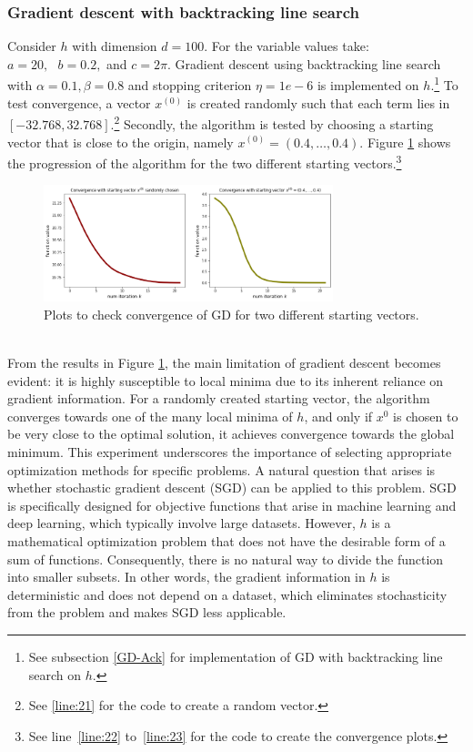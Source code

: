  \subsubsection{Gradient descent with backtracking line search}
 Consider $h$ with dimension $d=100.$ For the variable values take: $a = 20,\text{ }b = 0.2,$ and $c = 2\pi$. Gradient descent using backtracking line search with $\alpha = 0.1, \beta = 0.8$ and stopping criterion $\eta = 1e-6$ is implemented on $h.$\footnote{See subsection \ref{GD-Ack} for implementation of GD with backtracking line search on $h.$} To test convergence, a vector $x^{(0)}$ is created randomly such that each term lies in $[-32.768, 32.768]$.\footnote{See \ref{line:21} for the code to create a random vector.} Secondly, the algorithm is tested by choosing a starting vector that is close to the origin, namely $x^{(0)}=(0.4,\ldots,0.4).$ Figure \ref{fig:Ackelys_conv_check} shows the progression of the algorithm for the two different starting vectors.\footnote{See line~\ref{line:22} to~\ref{line:23} for the code to create the convergence plots.}
\begin{figure}[h!]
    \centering
        \includegraphics[width=0.75\textwidth]{Pictures/Merged_conv_ackleys.png}
    \caption{Plots to check convergence of GD for two different starting vectors.}\label{fig:Ackelys_conv_check}
\end{figure}\\
\newpage
From the results in Figure \ref{fig:Ackelys_conv_check}, the main limitation of gradient descent becomes evident: it is highly susceptible to local minima due to its inherent reliance on gradient information. For a randomly created starting vector, the algorithm converges towards one of the many local minima of $h$, and only if $x^{0}$ is chosen to be very close to the optimal solution, it achieves convergence towards the global minimum. This experiment underscores the importance of selecting appropriate optimization methods for specific problems. A natural question that arises is whether stochastic gradient descent (SGD) can be applied to this problem. SGD is specifically designed for objective functions that arise in machine learning and deep learning, which typically involve large datasets. However, $h$ is a mathematical optimization problem that does not have the desirable form of a sum of functions. Consequently, there is no natural way to divide the function into smaller subsets. In other words, the gradient information in $h$ is deterministic and does not depend on a dataset, which eliminates stochasticity from the problem and makes SGD less applicable.

